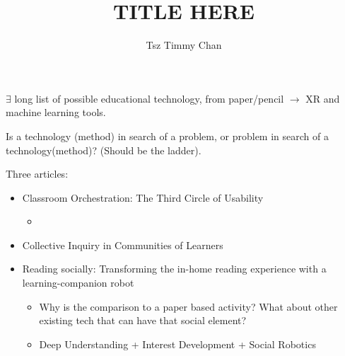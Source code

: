 \documentclass{TC}
\title{TITLE HERE}	%
\author{Tsz Timmy Chan}	%
\begin{document}
$\exists$ long list of possible educational technology, from paper/pencil $\to$ XR and machine learning tools.

Is a technology (method) in search of a problem, or problem in search of a technology(method)? (Should be the ladder).

Three articles:
\begin{itemize}
\item Classroom Orchestration: The Third Circle of Usability \parencite{dillenbourg_classroom_2011}
	\begin{itemize}
	\item
	\end{itemize}

\item Collective Inquiry in Communities of Learners \parencite{fischer_collective_2018}
\item Reading socially: Transforming the in-home reading experience with a learning-companion robot \parencite{michaelis_reading_2018}
	\begin{itemize}
	\item Why is the comparison to a paper based activity? What about other existing tech that can have that social element?
	\item Deep Understanding + Interest Development + Social Robotics 
	\end{itemize}
\end{itemize}
\end{document}
